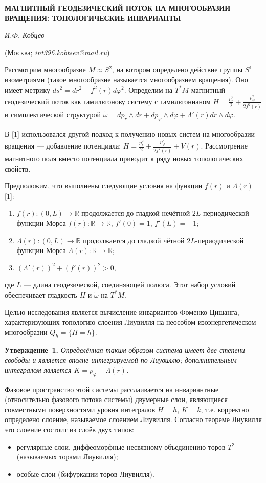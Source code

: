 \begin{center}
    {\bf МАГНИТНЫЙ ГЕОДЕЗИЧЕСКИЙ ПОТОК НА МНОГООБРАЗИИ ВРАЩЕНИЯ: ТОПОЛОГИЧЕСКИЕ ИНВАРИАНТЫ}

    {\it И.Ф. Кобцев}

    (Москва; {\it int396.kobtsev@mail.ru})
\end{center}

Рассмотрим многообразие $M \approx S^2$, на котором определено действие группы $S^1$ изометриями (такое многообразие называется многообразием вращения). Оно имеет метрику $ds^2=dr^2+f^2(r)d\varphi^2$. Определим на $T^*M$ магнитный геодезический поток как гамильтонову систему с гамильтонианом $H = \frac{p_r^2}{2}+\frac{p_\varphi^2}{2f^2(r)}$ и симплектической структурой $\widetilde{\omega}=dp_r \wedge dr + dp_\varphi \wedge d\varphi+\Lambda'(r)dr \wedge d\varphi$.

В [1] использовался другой подход к получению новых систем на многообразии вращения --- добавление потенциала: $H = \frac{p_r^2}{2}+\frac{p_\varphi^2}{2f^2(r)}+V(r)$. Рассмотрение магнитного поля вместо потенциала приводит к ряду новых топологических свойств.

Предположим, что выполнены следующие условия на функции $f(r)$ и $\Lambda(r)$ [1]:
\begin{enumerate}
	\item $f(r):(0,L)\to \mathbb{R}$ продолжается до гладкой нечётной $2L$-периодической функции Морса $f(r):\mathbb{R}\to \mathbb{R}$, $f'(0)=1$, $f'(L)=-1$;
	\item $\Lambda(r):(0,L)\to \mathbb{R}$ продолжается до гладкой чётной $2L$-периодической функции Морса $\Lambda(r):\mathbb{R}\to \mathbb{R}$;
	\item $(\Lambda'(r))^2+(f'(r))^2>0$,
\end{enumerate}
где $L$ --- длина геодезической, соединяющей полюса. Этот набор условий обеспечивает гладкость $H$ и $\widetilde{\omega}$ на $T^*M$.

Целью исследования является вычисление инвариантов Фоменко-Цишанга, характеризующих топологию слоения Лиувилля на неособом изоэнергетическом многообразии $Q_h=\{H=h\}$.

\textbf{Утверждение~1.} {\it Определённая таким образом система имеет две степени свободы и является вполне интегрируемой по Лиувиллю; дополнительным интегралом является $K=p_\varphi-\Lambda(r)$.}

Фазовое пространство этой системы расслаивается на инвариантные (относительно фазового потока системы) двумерные слои, являющиеся совместными поверхностями уровня интегралов $H=h$, $K=k$, т.е. корректно определено слоение, называемое слоением Лиувилля. Согласно теореме Лиувилля это слоение состоит из слоёв двух типов:
\begin{itemize}
	\item регулярные слои, диффеоморфные несвязному объединению торов $T^2$ (называемых торами Лиувилля);
	\item особые слои (бифуркации торов Лиувилля).
\end{itemize}

